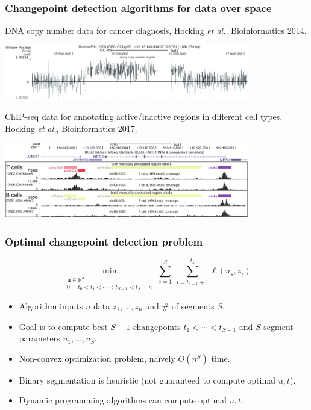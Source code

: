 \documentclass{beamer}
\newcommand{\RR}{\mathbb R}
\begin{document}
\begin{frame}
  \frametitle{Changepoint detection algorithms for data over space}

  DNA copy number data for cancer diagnosis, Hocking \emph{et
    al.}, Bioinformatics 2014.

  \includegraphics[width=0.8\textwidth]{intro-breakpoints}

  ChIP-seq data for annotating active/inactive regions in different cell types, Hocking 
  \emph{et al.}, Bioinformatics 2017.

  \includegraphics[width=0.8\textwidth]{intro-peaks}

\end{frame}

\begin{frame}
  \frametitle{Optimal changepoint detection problem}
  
  \vskip -1cm    
$$
\min_{\substack{
  \mathbf u\in\RR^{S}
\\
   0=t_0<t_1<\cdots<t_{S-1}<t_S=n
  }} 
    \sum_{s=1}^S\  \sum_{i=t_{s-1}+1}^{t_s} \ell( u_s,  z_i) 
$$
  \begin{itemize}
  \item Algorithm inputs $n$ data $z_1, \dots, z_n$ and \# of segments $S$.
  \item Goal is to compute best $S-1$ changepoints
    $t_1 < \cdots < t_{S-1}$ and $S$ segment parameters $u_1,\dots,u_S$.
  \item Non-convex optimization problem, na\" ively $O(n^S)$ time.
  \item Binary segmentation is heuristic (not guaranteed to compute optimal $u,t$).
  \item Dynamic programming algorithms can compute optimal $u,t$.
  \end{itemize}
\end{frame}
\end{document}
